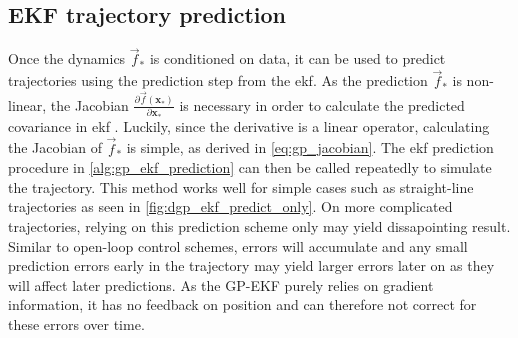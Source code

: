 \subsection{EKF trajectory prediction}
Once the dynamics $\vec{f}_*$ is conditioned on data, it can be used to predict trajectories using the prediction step from the \acrshort{ekf}. As the prediction $\vec{f}_*$ is non-linear, the Jacobian $\frac{\partial \vec{f}(\boldsymbol{x}_*)}{\partial \boldsymbol{x}_*}$ is necessary in order to calculate the predicted covariance in \acrshort{ekf} \cite{gpekf}. Luckily, since the derivative is a linear operator, calculating the Jacobian of $\vec{f}_*$ is simple, as derived in \cref{eq:gp_jacobian}. The \acrshort{ekf} prediction procedure in \cref{alg:gp_ekf_prediction} can then be called repeatedly to simulate the trajectory. This method works well for simple cases such as straight-line trajectories as seen in \cref{fig:dgp_ekf_predict_only}. On more complicated trajectories, relying on this prediction scheme only may yield dissapointing result. Similar to open-loop control schemes, errors will accumulate and any small prediction errors early in the trajectory may yield larger errors later on as they will affect later predictions. As the GP-EKF purely relies on gradient information, it has no feedback on position and can therefore not correct for these errors over time.




